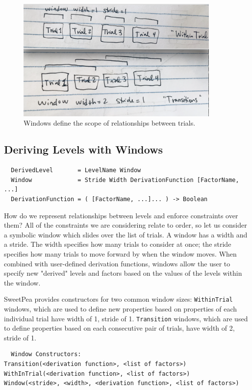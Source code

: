 \begin{figure}[t]
    \centerline{\includegraphics[origin=c,width=10cm]{fig_windows}}
    \caption{Windows define the scope of relationships between trials.}%
    \label{fig:windows}%
\end{figure}


\subsection{Deriving Levels with Windows}

\begin{verbatim}
  DerivedLevel       = LevelName Window
  Window             = Stride Width DerivationFunction [FactorName, ...]
  DerivationFunction = ( [FactorName, ...]... ) -> Boolean
\end{verbatim}

How do we represent relationships between levels and enforce constraints over them? All of the constraints we are considering relate to order, so let us consider a symbolic window which slides over the list of trials. A window has a width and a stride. The width specifies how many trials to consider at once; the stride specifies how many trials to move forward by when the window moves. When combined with user-defined derivation functions, windows allow the user to specify new "derived" levels and factors based on the values of the levels within the window.

SweetPea provides constructors for two common window sizes: \texttt{WithinTrial} windows, which are used to define new properties based on properties of each individual trial have width of 1, stride of 1. \texttt{Transition} windows, which are used to define properties based on each consecutive pair of trials, have width of 2, stride of 1.

\begin{verbatim}
  Window Constructors:
Transition(<derivation function>, <list of factors>)
WithInTrial(<derivation function>, <list of factors>)
Window(<stride>, <width>, <derivation function>, <list of factors>)
\end{verbatim}

